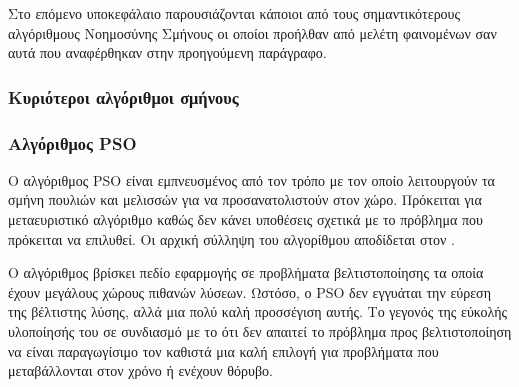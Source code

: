 \documentclass{assignment}
\begin{document}
Στο επόμενο υποκεφάλαιο παρουσιάζονται κάποιοι από τους σημαντικότερους
αλγόριθμους Νοημοσύνης Σμήνους οι οποίοι προήλθαν από μελέτη φαινομένων σαν
αυτά που αναφέρθηκαν στην προηγούμενη παράγραφο.
\subsubsection*{Κυριότεροι αλγόριθμοι σμήνους}
\subsubsection*{Αλγόριθμος PSO}
O αλγόριθμος PSO είναι εμπνευσμένος από τον τρόπο με τον οποίο λειτουργούν
τα σμήνη πουλιών και μελισσών για να προσανατολιστούν στον χώρο. Πρόκειται για
μεταευριστικό αλγόριθμο καθώς δεν κάνει υποθέσεις σχετικά με το πρόβλημα που
πρόκειται να επιλυθεί. Οι αρχική σύλληψη του αλγορίθμου αποδίδεται στον \citet{kennedy2010particle}.

Ο αλγόριθμος βρίσκει πεδίο εφαρμογής σε προβλήματα βελτιστοποίησης τα οποία
έχουν μεγάλους χώρους πιθανών λύσεων. Ωστόσο, ο PSO δεν εγγυάται την εύρεση
της βέλτιστης λύσης, αλλά μια πολύ καλή προσσέγιση αυτής. Το γεγονός της εύκολής
υλοποίησής του σε συνδιασμό με το ότι δεν απαιτεί το πρόβλημα προς
βελτιστοποίηση να είναι παραγωγίσιμο \cite{kennedy2010particle} τον καθιστά μια
καλή επιλογή για προβλήματα που μεταβάλλονται στον χρόνο ή ενέχουν θόρυβο.
\end{document}
